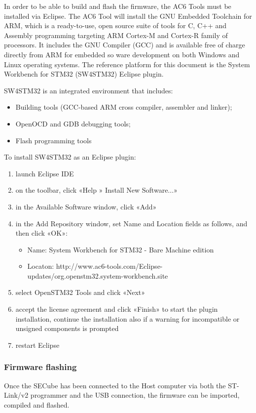 In order to be able to build and flash the firmware, the AC6 Tools must be installed via Eclipse. The AC6 Tool will install the GNU Embedded Toolchain for ARM, which is a ready-to-use, open
source suite of tools for C, C++ and Assembly programming targeting ARM Cortex-M and Cortex-R
family of processors. It includes the GNU Compiler (GCC) and is available free of charge directly
from ARM for embedded so ware development on both Windows and Linux operating systems.
The reference platform for this document is the System Workbench for STM32 (SW4STM32) Eclipse
plugin.

SW4STM32 is an integrated environment that includes:
\begin{itemize}
	\item Building tools (GCC-based ARM cross compiler, assembler and linker);
	\item OpenOCD and GDB debugging tools;
	\item Flash programming tools
\end{itemize}

To install SW4STM32 as an Eclipse plugin:
\begin{enumerate}
	\item launch Eclipse IDE
	\item on the toolbar, click «Help » Install New Software...»
	\item in the Available Software window, click «Add»
	\item in the Add Repository window, set Name and Location fields as follows, and then click «OK»:
	\begin{itemize}
		\item Name: System Workbench for STM32 - Bare Machine edition
		\item Locaton: http://www.ac6-tools.com/Eclipse-updates/org.openstm32.system-workbench.site
	\end{itemize}
	\item select OpenSTM32 Tools and click «Next»
	\item accept the license agreement and click «Finish» to start the plugin installation, continue the installation also if a warning for incompatible or unsigned components is prompted
	\item restart Eclipse
\end{enumerate}



\subsubsection{Firmware flashing}
Once the SECube has been connected to the Host computer via both the ST-Link/v2 programmer and the USB connection, the firmware can be imported, compiled and flashed. 

